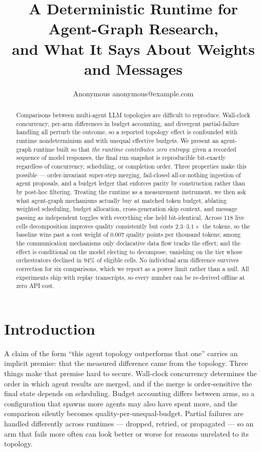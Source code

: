 \documentclass[10pt]{article}
\title{A Deterministic Runtime for Agent-Graph Research,\\
       and What It Says About Weights and Messages}
\author{\name Anonymous \email anonymous@example.com}
\begin{document}
\maketitle

\begin{abstract}
Comparisons between multi-agent LLM topologies are difficult to reproduce.
Wall-clock concurrency, per-arm differences in budget accounting, and divergent
partial-failure handling all perturb the outcome, so a reported topology effect
is confounded with runtime nondeterminism and with unequal effective budgets.
We present an agent-graph runtime built so that \emph{the runtime contributes
zero entropy}: given a recorded sequence of model responses, the final run
snapshot is reproducible bit-exactly regardless of concurrency, scheduling, or
completion order. Three properties make this possible --- order-invariant
super-step merging, fail-closed all-or-nothing ingestion of agent proposals, and
a budget ledger that enforces parity by construction rather than by post-hoc
filtering. Treating the runtime as a measurement instrument, we then ask what
agent-graph mechanisms actually buy at matched token budget, ablating weighted
scheduling, budget allocation, cross-generation skip context, and message
passing as independent toggles with everything else held bit-identical. Across 118 live cells decomposition improves quality consistently but costs
$2.3$--$3.1\times$ the tokens, so the baseline wins past a cost weight of
$0.007$ quality points per thousand tokens; among the communication mechanisms
only declarative data flow tracks the effect; and the effect is conditional on
the model electing to decompose, vanishing on the tier whose orchestrators
declined in 94\% of eligible cells. No individual arm difference survives
correction for six comparisons, which we report as a power limit rather than
a null.
All experiments ship with replay transcripts, so every number can be re-derived
offline at zero API cost.
\end{abstract}

\section{Introduction}
\label{sec:intro}

A claim of the form ``this agent topology outperforms that one'' carries an
implicit premise: that the measured difference came from the topology. Three
things make that premise hard to secure. Wall-clock concurrency determines the
order in which agent results are merged, and if the merge is order-sensitive the
final state depends on scheduling. Budget accounting differs between arms, so a
configuration that spawns more agents may also have spent more, and the
comparison silently becomes quality-per-unequal-budget. Partial failures are
handled differently across runtimes --- dropped, retried, or propagated --- so
an arm that fails more often can look better or worse for reasons unrelated to
its topology.
\end{document}
